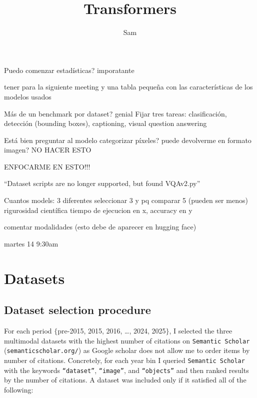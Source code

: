 \documentclass{article}
\title{Transformers}
\author{Sam}
\date{}
\begin{document}
\maketitle
\tableofcontents

Puedo comenzar estadísticas? imporatante

tener para la siguiente meeting
y una tabla pequeña con las características de los modelos usados

Más de un benchmark por dataset? genial
Fijar tres tareas: clasificación, detección (bounding boxes), captioning, visual question answering

Está bien preguntar al modelo categorizar píxeles? puede devolverme en formato imagen?
NO HACER ESTO

ENFOCARME EN ESTO!!!

``Dataset scripts are no longer supported, but found VQAv2.py''

Cuantos models: 3 diferentes
seleccionar 3 y pq
comparar 5 (pueden ser menos)
rigurosidad  científica
tiempo de ejecucion en x, accuracy en y

comentar modalidades (esto debe de aparecer en hugging face)

martes 14 9:30am









\section{Datasets}

\subsection{Dataset selection procedure}

For each period $\{$pre-2015, 2015, 2016, \dots, 2024, 2025$\}$, I selected the three multimodal datasets with the highest number of citations on \texttt{Semantic Scholar} (\texttt{semanticscholar.org/}) as Google scholar does not allow me to order items by number of citations. Concretely, for each year bin I queried \texttt{Semantic Scholar} with the keywords \texttt{``dataset''}, \texttt{``image''}, and \texttt{``objects''} and then ranked results by the number of citations. A dataset was included only if it satisfied all of the following:
\end{document}
